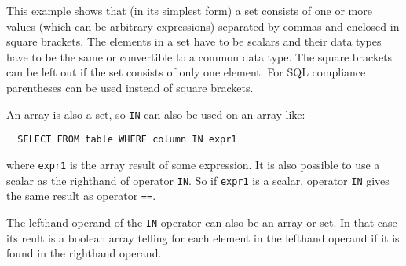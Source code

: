 This example shows that (in its simplest form) a set
consists of one or more values (which
can be arbitrary expressions) separated by commas and enclosed in
square brackets. The elements in a set have to be scalars and their
data types have to be the same or convertible to a common data type.
 The square brackets can be left out if
the set consists of only one element. For SQL compliance
parentheses can be used instead of square brackets.

An array is also a set, so \texttt{IN} can also be used on an array
like:
\begin{verbatim}
  SELECT FROM table WHERE column IN expr1
\end{verbatim}
where \texttt{expr1} is the array result of some expression.
 It is also possible to use a scalar as the
righthand of operator \texttt{IN}.
So if \texttt{expr1} is a scalar, operator \texttt{IN}
gives the same result as operator \texttt{==}.

The lefthand operand of the \texttt{IN} operator can also be an array or
set. In that case its reult is a boolean array telling for each
element in the lefthand operand if it is found in the righthand
operand.

